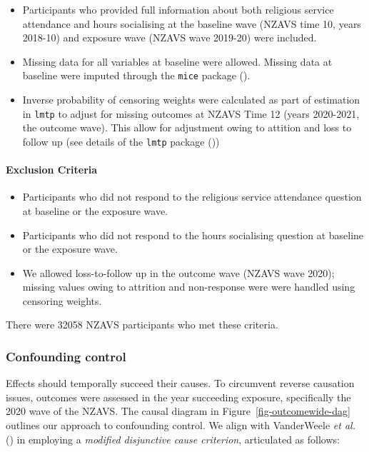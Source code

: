 \documentclass[
  singlecolumn]{article}
\let\oldparagraph\paragraph
\renewcommand{\paragraph}[1]{\oldparagraph{#1}\mbox{}}
\providecommand{\tightlist}{%
  \setlength{\itemsep}{0pt}\setlength{\parskip}{0pt}}\usepackage{longtable,booktabs,array}
\begin{document}
\begin{itemize}
\tightlist
\item
  Participants who provided full information about both religious
  service attendance and hours socialising at the baseline wave (NZAVS
  time 10, years 2018-10) and exposure wave (NZAVS wave 2019-20) were
  included.
\item
  Missing data for all variables at baseline were allowed. Missing data
  at baseline were imputed through the \texttt{mice} package
  ().
\item
  Inverse probability of censoring weights were calculated as part of
  estimation in \texttt{lmtp} to adjust for missing outcomes at NZAVS
  Time 12 (years 2020-2021, the outcome wave). This allow for adjustment
  owing to attition and loss to follow up (see details of the
  \texttt{lmtp} package ())
\end{itemize}

\paragraph{Exclusion Criteria}\label{exclusion-criteria}

\begin{itemize}
\tightlist
\item
  Participants who did not respond to the religious service attendance
  question at baseline or the exposure wave.
\item
  Participants who did not respond to the hours socialising question at
  baseline or the exposure wave.
\item
  We allowed loss-to-follow up in the outcome wave (NZAVS wave 2020);
  missing values owing to attrition and non-response were were handled
  using censoring weights.
\end{itemize}

There were 32058 NZAVS participants who met these criteria.

\subsubsection{Confounding control}\label{confounding-control}

Effects should temporally succeed their causes. To circumvent reverse
causation issues, outcomes were assessed in the year succeeding
exposure, specifically the 2020 wave of the NZAVS. The causal diagram in
Figure~\ref{fig-outcomewide-dag} outlines our approach to confounding
control. We align with VanderWeele \emph{et al.}
() in employing a \emph{modified
disjunctive cause criterion}, articulated as follows:
\end{document}
